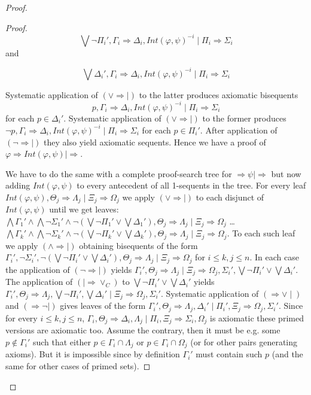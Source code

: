\documentclass[11pt,a4paper,titlepage]{article}
\theoremstyle{definition}
\newcommand{\3}{\vspace{.3in}}
\newcommand{\2}{\vspace{.2in}}
\newcommand{\1}{\vspace{.1in}}
\newcommand{\5}{\vspace{.05in}}
\begin{document}
\begin{proof}
\begin{proof}
$$\bigvee\neg\Pi_i', \Gamma_i\Rightarrow\Delta_i, Int(\varphi, \psi)^{-i}\mid  \Pi_i\Rightarrow\Sigma_i$$ and 

$$\bigvee\Delta_i',\Gamma_i\Rightarrow\Delta_i, Int(\varphi, \psi)^{-i}\mid  \Pi_i\Rightarrow\Sigma_i$$

Systematic application of $(\vee\Rightarrow\mid)$ to the latter produces axiomatic bisequents $$p,\Gamma_i\Rightarrow\Delta_i, Int(\varphi, \psi)^{-i}\mid  \Pi_i\Rightarrow\Sigma_i$$ for each $p\in \Delta_i'$. Systematic application of $(\vee\Rightarrow\mid)$ to the former produces $\neg p,\Gamma_i\Rightarrow\Delta_i, Int(\varphi, \psi)^{-i}\mid  \Pi_i\Rightarrow\Sigma_i$ for each $p\in \Pi_i'$. After application of $(\neg\Rightarrow\mid)$ they also yield axiomatic sequents.
Hence we have a proof of $\varphi\Rightarrow Int(\varphi, \psi)\mid\Rightarrow$.

We have to do the same with a complete proof-search tree for $\Rightarrow\psi\mid\Rightarrow$ but now adding $Int(\varphi, \psi)$ to every antecedent of all 1-sequents in the tree. For every leaf 
$Int(\varphi, \psi), \Theta_j\Rightarrow\Lambda_j\mid\Xi_j\Rightarrow\Omega_j$  we apply $(\vee\Rightarrow|)$ to each disjunct of $Int(\varphi, \psi)$ until we get leaves: $\bigwedge\Gamma_1'\wedge \bigwedge\neg\Sigma_1'\wedge \neg(\bigvee\neg\Pi_1'\vee\bigvee\Delta_1'), \Theta_j\Rightarrow\Lambda_j\mid\Xi_j\Rightarrow\Omega_j$ \ldots 
$\bigwedge\Gamma_k'\wedge \bigwedge\neg\Sigma_k'\wedge \neg(\bigvee\neg\Pi_k'\vee\bigvee\Delta_k'), \Theta_j\Rightarrow\Lambda_j\mid\Xi_j\Rightarrow\Omega_j$.
To each such leaf we apply $(\wedge\Rightarrow\mid)$ obtaining bisequents of the form $\Gamma_i', \neg\Sigma_i', \neg(\bigvee\neg\Pi_i'\vee\bigvee\Delta_i'), \Theta_j\Rightarrow\Lambda_j\mid\Xi_j\Rightarrow\Omega_j$ for $i\leq k, j\leq n$.
In each case the application of $(\neg\Rightarrow\mid)$ yields
$\Gamma_i', \Theta_j\Rightarrow\Lambda_j\mid\Xi_j\Rightarrow\Omega_j, \Sigma_i', \bigvee\neg\Pi_i'\vee\bigvee\Delta_i'$. 
The application of $(\mid\Rightarrow\vee_C)$ to  $\bigvee\neg\Pi_i'\vee\bigvee\Delta_i' $ yields
$\Gamma_i', \Theta_j\Rightarrow\Lambda_j,  \bigvee\neg\Pi_i', \bigvee\Delta_i'\mid\Xi_j\Rightarrow\Omega_j, \Sigma_i'$. Systematic application of $(\Rightarrow\vee\mid)$ and $(\Rightarrow\neg\mid)$ gives leaves of the form
$\Gamma_i', \Theta_j\Rightarrow\Lambda_j,  \Delta_i'\mid\Pi_i', \Xi_j\Rightarrow\Omega_j, \Sigma_i'$. Since for every $i\leq k, j\leq n$, $\Gamma_i, \Theta_j\Rightarrow\Delta_i, \Lambda_j\mid\Pi_i, \Xi_j\Rightarrow\Sigma_i, \Omega_j$ is axiomatic these primed versions are 
axiomatic too. Assume the contrary, then it must be e.g. some $p\notin \Gamma_i'$ such that either $p\in\Gamma_i\cap\Lambda_j $ or $p\in \Gamma_i\cap \Omega_j$ (or for other pairs generating axioms). But it is impossible since by definition $\Gamma_i'$ must contain such $p$ (and the same for other cases of primed sets).


\end{proof}
\end{proof}
\end{document}
